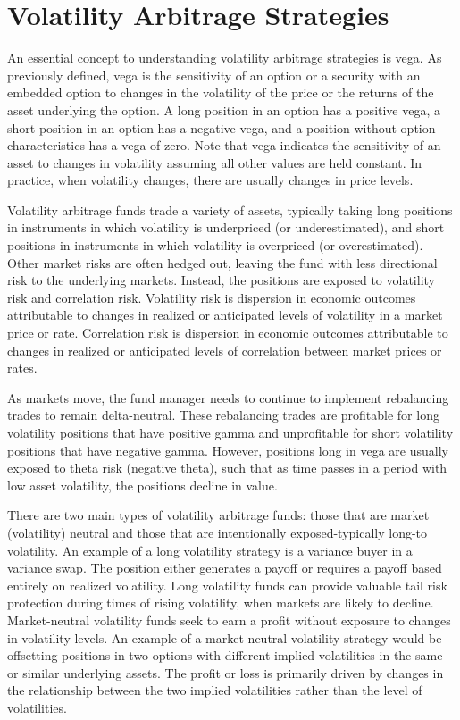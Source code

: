 \documentclass[11pt]{article}
\begin{document}
\section*{Volatility Arbitrage Strategies}
An essential concept to understanding volatility arbitrage strategies is vega. As previously defined, vega is the sensitivity of an option or a security with an embedded option to changes in the volatility of the price or the returns of the asset underlying the option. A long position in an option has a positive vega, a short position in an option has a negative vega, and a position without option characteristics has a vega of zero. Note that vega indicates the sensitivity of an asset to changes in volatility assuming all other values are held constant. In practice, when volatility changes, there are usually changes in price levels.

Volatility arbitrage funds trade a variety of assets, typically taking long positions in instruments in which volatility is underpriced (or underestimated), and short positions in instruments in which volatility is overpriced (or overestimated). Other market risks are often hedged out, leaving the fund with less directional risk to the underlying markets. Instead, the positions are exposed to volatility risk and correlation risk. Volatility risk is dispersion in economic outcomes attributable to changes in realized or anticipated levels of volatility in a market price or rate. Correlation risk is dispersion in economic outcomes attributable to changes in realized or anticipated levels of correlation between market prices or rates.

As markets move, the fund manager needs to continue to implement rebalancing trades to remain delta-neutral. These rebalancing trades are profitable for long volatility positions that have positive gamma and unprofitable for short volatility positions that have negative gamma. However, positions long in vega are usually exposed to theta risk (negative theta), such that as time passes in a period with low asset volatility, the positions decline in value.

There are two main types of volatility arbitrage funds: those that are market (volatility) neutral and those that are intentionally exposed-typically long-to volatility. An example of a long volatility strategy is a variance buyer in a variance swap. The position either generates a payoff or requires a payoff based entirely on realized volatility. Long volatility funds can provide valuable tail risk protection during times of rising volatility, when markets are likely to decline. Market-neutral volatility funds seek to earn a profit without exposure to changes in volatility levels. An example of a market-neutral volatility strategy would be offsetting positions in two options with different implied volatilities in the same or similar underlying assets. The profit or loss is primarily driven by changes in the relationship between the two implied volatilities rather than the level of volatilities.
\end{document}
